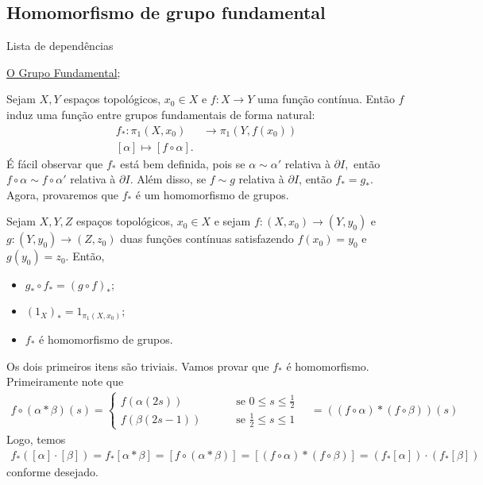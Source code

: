 \subsection{Homomorfismo de grupo fundamental}
\label{hom-grupo-fundamental}
\begin{titlemize}{Lista de dependências}
	\item \hyperref[grupo-fundamental-def]{O Grupo Fundamental};\\ %
\end{titlemize}
Sejam $X,Y$ espaços topológicos, $x_0\in X$ e $f:X\rightarrow Y$ uma função contínua. Então $f$ induz uma função entre grupos fundamentais de forma natural:
\begin{align*}
    f_*:\pi_1(X,x_0)&\longrightarrow\pi_1(Y,f(x_0))\\
    [\alpha]\longmapsto [f\circ \alpha].
\end{align*}
É fácil observar que $f_*$ está bem definida, pois se $\alpha\sim \alpha'$ relativa à $\partial I,$ então $f\circ \alpha\sim f\circ \alpha'$ relativa à $\partial I$. Além disso, se $f\sim g$ relativa à $\partial I$, então $f_*=g_*$. Agora, provaremos que $f_*$ é um homomorfismo de grupos.
\begin{prop}
    Sejam $X,Y,Z$ espaços topológicos, $x_0\in X$ e sejam $f:(X,x_0)\rightarrow (Y,y_0)$ e $g:(Y,y_0)\rightarrow (Z,z_0)$ duas funções contínuas satisfazendo $f(x_0)=y_0$ e $g(y_0)=z_0.$ Então, 
    \begin{itemize}
        \item $g_*\circ f_*=(g\circ f)_*;$
        \item $(1_X)_*=1_{\pi_1(X,x_0)};$
        \item $f_*$ é homomorfismo de grupos.
    \end{itemize}
\end{prop}
    
\begin{dem}
    Os dois primeiros itens são triviais. Vamos provar que $f_*$ é homomorfismo. Primeiramente note que 
    \begin{align*}
        f\circ (\alpha*\beta)(s)=\begin{cases}
            f(\alpha(2s))&\qquad\mbox{ se }0\le s\le \frac{1}{2}\\
            f(\beta(2s-1))&\qquad\mbox{ se }\frac{1}{2}\le s\le 1
        \end{cases}\quad= ((f\circ\alpha)*(f\circ \beta))(s)
    \end{align*}
    Logo, temos
    \begin{align*}
        f_*([\alpha]\cdot [\beta])=f_*[\alpha*\beta]=[f\circ (\alpha*\beta)]=[(f\circ\alpha)*(f\circ\beta)]=(f_*[\alpha])\cdot (f_*[\beta])
    \end{align*}
    conforme desejado.
\end{dem}

